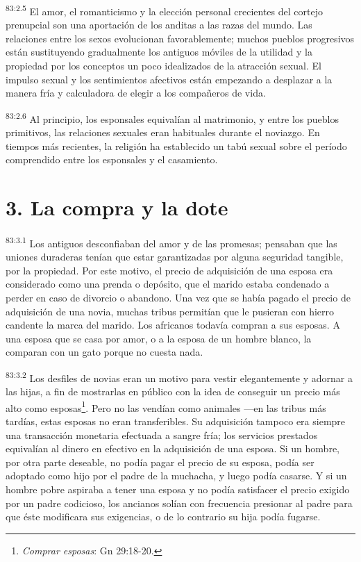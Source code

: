 \documentclass[twoside, 11pt]{book}
\begin{document}
\par
\textsuperscript{83:2.5} El amor, el romanticismo y la elección personal crecientes del cortejo prenupcial son una aportación de los anditas a las razas del mundo. Las relaciones entre los sexos evolucionan favorablemente; muchos pueblos progresivos están sustituyendo gradualmente los antiguos móviles de la utilidad y la propiedad por los conceptos un poco idealizados de la atracción sexual. El impulso sexual y los sentimientos afectivos están empezando a desplazar a la manera fría y calculadora de elegir a los compañeros de vida.

\par
\textsuperscript{83:2.6} Al principio, los esponsales equivalían al matrimonio, y entre los pueblos primitivos, las relaciones sexuales eran habituales durante el noviazgo. En tiempos más recientes, la religión ha establecido un tabú sexual sobre el período comprendido entre los esponsales y el casamiento.

\section*{3. La compra y la dote}
\par
\textsuperscript{83:3.1} Los antiguos desconfiaban del amor y de las promesas; pensaban que las uniones duraderas tenían que estar garantizadas por alguna seguridad tangible, por la propiedad. Por este motivo, el precio de adquisición de una esposa era considerado como una prenda o depósito, que el marido estaba condenado a perder en caso de divorcio o abandono. Una vez que se había pagado el precio de adquisición de una novia, muchas tribus permitían que le pusieran con hierro candente la marca del marido. Los africanos todavía compran a sus esposas. A una esposa que se casa por amor, o a la esposa de un hombre blanco, la comparan con un gato porque no cuesta nada.

\par
\textsuperscript{83:3.2} Los desfiles de novias eran un motivo para vestir elegantemente y adornar a las hijas, a fin de mostrarlas en público con la idea de conseguir un precio más alto como esposas\footnote{\textit{Comprar esposas}: Gn 29:18-20.}. Pero no las vendían como animales ---en las tribus más tardías, estas esposas no eran transferibles. Su adquisición tampoco era siempre una transacción monetaria efectuada a sangre fría; los servicios prestados equivalían al dinero en efectivo en la adquisición de una esposa. Si un hombre, por otra parte deseable, no podía pagar el precio de su esposa, podía ser adoptado como hijo por el padre de la muchacha, y luego podía casarse. Y si un hombre pobre aspiraba a tener una esposa y no podía satisfacer el precio exigido por un padre codicioso, los ancianos solían con frecuencia presionar al padre para que éste modificara sus exigencias, o de lo contrario su hija podía fugarse.
\end{document}
